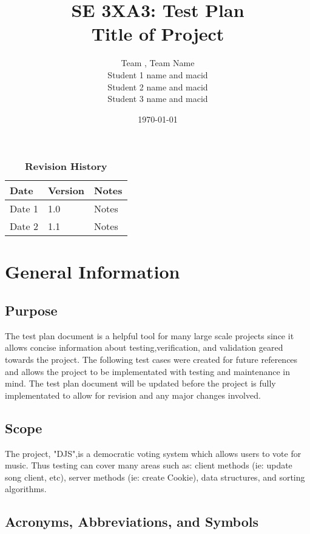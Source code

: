 \documentclass[12pt, titlepage]{article}
\title{SE 3XA3: Test Plan\\Title of Project}
\author{Team , Team Name
		\\ Student 1 name and macid
		\\ Student 2 name and macid
		\\ Student 3 name and macid
}
\date{\today}
\begin{document}
\maketitle

\tableofcontents
\listoftables
\listoffigures

\begin{table}[bp]
\caption{\bf Revision History}
\begin{tabularx}{\textwidth}{p{3cm}p{2cm}X}
\toprule {\bf Date} & {\bf Version} & {\bf Notes}\\
\midrule
Date 1 & 1.0 & Notes\\
Date 2 & 1.1 & Notes\\
\bottomrule
\end{tabularx}
\end{table}

\newpage



\section{General Information}

\subsection{Purpose}
The test plan document is a helpful tool for many large scale projects since it allows concise information about testing,verification, and validation geared towards the project. The following test cases were created for future references and allows the project to be implementated with testing and maintenance in mind. The test plan document will be updated before the project is fully implementated to allow for revision and any major changes involved.

\subsection{Scope}
The project, "DJS",is a democratic voting system which allows users to vote for music. Thus testing can cover many areas such as: client methods (ie: update song client, etc), server methods (ie: create Cookie), data structures, and sorting algorithms. 

\subsection{Acronyms, Abbreviations, and Symbols}
	
\end{document}
